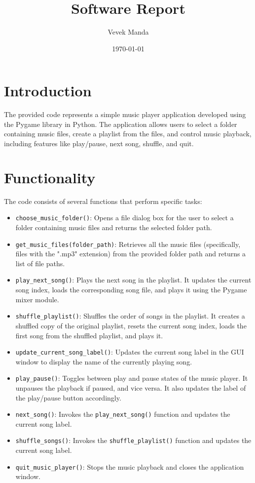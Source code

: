 \documentclass{article}
\title{Software Report}
\author{Vevek Manda}
\date{\today}
\begin{document}
\maketitle

\section{Introduction}
The provided code represents a simple music player application developed using the Pygame library in Python. The application allows users to select a folder containing music files, create a playlist from the files, and control music playback, including features like play/pause, next song, shuffle, and quit.

\section{Functionality}
The code consists of several functions that perform specific tasks:

\begin{itemize}
  \item \texttt{choose\_music\_folder()}: Opens a file dialog box for the user to select a folder containing music files and returns the selected folder path.

  \item \texttt{get\_music\_files(folder\_path)}: Retrieves all the music files (specifically, files with the ".mp3" extension) from the provided folder path and returns a list of file paths.

  \item \texttt{play\_next\_song()}: Plays the next song in the playlist. It updates the current song index, loads the corresponding song file, and plays it using the Pygame mixer module.

  \item \texttt{shuffle\_playlist()}: Shuffles the order of songs in the playlist. It creates a shuffled copy of the original playlist, resets the current song index, loads the first song from the shuffled playlist, and plays it.

  \item \texttt{update\_current\_song\_label()}: Updates the current song label in the GUI window to display the name of the currently playing song.

  \item \texttt{play\_pause()}: Toggles between play and pause states of the music player. It unpauses the playback if paused, and vice versa. It also updates the label of the play/pause button accordingly.

  \item \texttt{next\_song()}: Invokes the \texttt{play\_next\_song()} function and updates the current song label.

  \item \texttt{shuffle\_songs()}: Invokes the \texttt{shuffle\_playlist()} function and updates the current song label.

  \item \texttt{quit\_music\_player()}: Stops the music playback and closes the application window.
\end{itemize}
\end{document}
